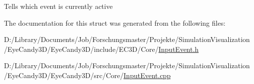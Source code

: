 Tells which event is currently active 

The documentation for this struct was generated from the following files\+:\begin{DoxyCompactItemize}
\item 
D\+:/\+Library/\+Documents/\+Job/\+Forschungsmaster/\+Projekte/\+Simulation\+Visualization/\+Eye\+Candy3\+D/\+Eye\+Candy3\+D/include/\+E\+C3\+D/\+Core/\mbox{\hyperlink{_input_event_8h}{Input\+Event.\+h}}\item 
D\+:/\+Library/\+Documents/\+Job/\+Forschungsmaster/\+Projekte/\+Simulation\+Visualization/\+Eye\+Candy3\+D/\+Eye\+Candy3\+D/src/\+Core/\mbox{\hyperlink{_input_event_8cpp}{Input\+Event.\+cpp}}\end{DoxyCompactItemize}
